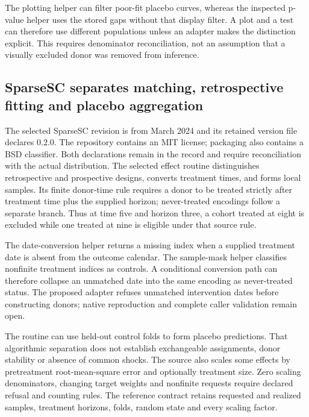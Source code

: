 The plotting helper can filter poor-fit placebo curves, whereas the inspected
p-value helper uses the stored gaps without that display filter. A plot and
a test can therefore use different populations unless an adapter makes the
distinction explicit. This requires denominator reconciliation, not an
assumption that a visually excluded donor was removed from inference.
\citep{exec25_synthpy_pysyncon}

\subsection{SparseSC separates matching, retrospective fitting and placebo aggregation}
The selected SparseSC revision is from March 2024 and its retained version
file declares 0.2.0. The repository contains an MIT license; packaging also
contains a BSD classifier. Both declarations remain in the record and require
reconciliation with the actual distribution. The selected effect routine
distinguishes retrospective and prospective designs, converts treatment
times, and forms local samples. Its finite donor-time rule requires a donor
to be treated strictly after treatment time plus the supplied horizon;
never-treated encodings follow a separate branch. Thus at time five and
horizon three, a cohort treated at eight is excluded while one treated at
nine is eligible under that source rule.~\citep{exec25_synthpy_sparse,
exec25_synthpy_choice}

The date-conversion helper returns a missing index when a supplied treatment
date is absent from the outcome calendar. The sample-mask helper classifies
nonfinite treatment indices as controls. A conditional conversion path can
therefore collapse an unmatched date into the same encoding as never-treated
status. The proposed adapter refuses unmatched intervention dates before
constructing donors; native reproduction and complete caller validation
remain open.~\citep{exec25_synthpy_sparse}

The routine can use held-out control folds to form placebo predictions.
That algorithmic separation does not establish exchangeable assignments,
donor stability or absence of common shocks. The source also scales some
effects by pretreatment root-mean-square error and optionally treatment
size. Zero scaling denominators, changing target weights and nonfinite
requests require declared refusal and counting rules. The reference
contract retains requested and realized samples, treatment horizons,
folds, random state and every scaling factor.~\citep{exec25_synthpy_sparse}

